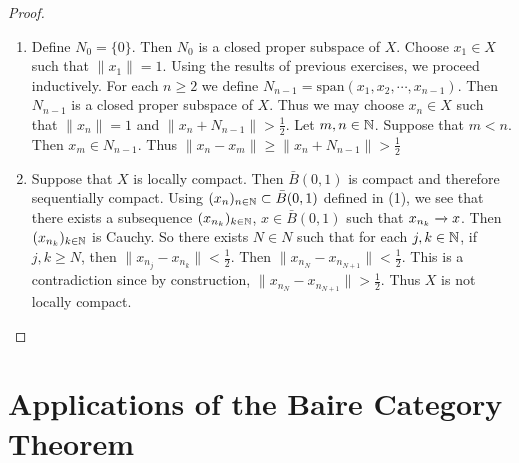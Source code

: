 \documentclass{book}
\begin{document}
	\begin{proof}\
		\begin{enumerate}
			\item Define $N_0 = \{0\}$. Then $N_0$ is a closed proper subspace of $X$. Choose $x_1 \in X$ such that $\|x_1 \|= 1$. Using the results of previous exercises, we proceed inductively. For each $n \geq 2$ we define $N_{n-1} = \text{span}(x_1, x_2, \cdots, x_{n-1})$. Then $N_{n-1}$ is a closed proper subspace of $X$. Thus we may choose $x_n \in X$ such that $\|x_n \|= 1$ and $\|x_n + N_{n-1} \|>  \frac{1}{2}$. Let $m,n \in \mathbb{N}$. Suppose that $m<n$. Then $x_m \in N_{n-1}$. Thus $\|x_n - x_m \|\geq \|x_n + N_{n-1} \|> \frac{1}{2}$\vspace{.5cm}\\
			\item Suppose that $X$ is locally compact. Then $\bar{B}(0,1)$ is compact and therefore sequentially compact. Using $(x_n)_{n \in \mathbb{N}} \subset \bar{B}(0,1)$ defined in (1), we see that there exists a subsequence $(x_{n_k})_{k \in \mathbb{N}}$, $x \in \bar{B}(0,1)$ such that $x_{n_k} \xrightarrow{} x$. Then $(x_{n_k})_{k \in \mathbb{N}}$ is Cauchy. So there exists $N \in N$ such that for each $j, k \in \mathbb{N}$, if $j, k \geq N$, then $\|x_{n_j} - x_{n_k} \|< \frac{1}{2}$. Then $\|x_{n_N} - x_{n_{N+1}} \| < \frac{1}{2}$. This is a contradiction since by construction, $\|x_{n_N} - x_{n_{N+1}} \| > \frac{1}{2}$. Thus $X$ is not locally compact.
		\end{enumerate}
	\end{proof}
	
	
	
	
	
	
	
	
	
	
	
	
	
	
	
	
	
	

	
	
	
	
	
	
	
	
	
	
	
	
	
	
	
	
	
	
	
	
	
	
	
	\newpage
	\section{Applications of the Baire Category Theorem} 
	
\end{document}
